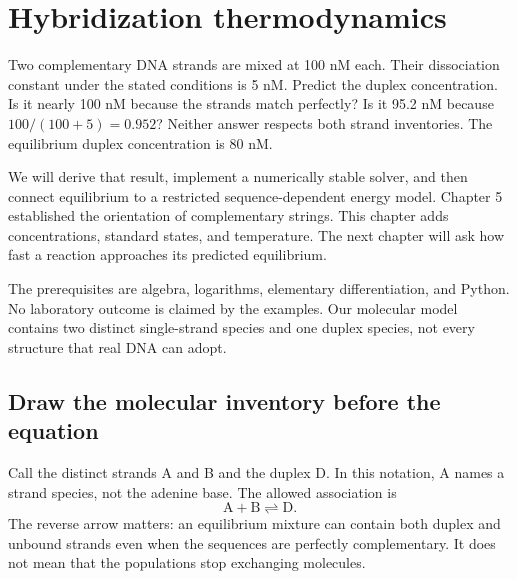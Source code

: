 \chapter{Hybridization thermodynamics}

Two complementary DNA strands are mixed at 100 nM each. Their dissociation
constant under the stated conditions is 5 nM. Predict the duplex concentration.
Is it nearly 100 nM because the strands match perfectly? Is it 95.2 nM
because $100/(100+5)=0.952$? Neither answer respects both strand inventories.
The equilibrium duplex concentration is 80 nM.

We will derive that result, implement a numerically stable solver, and then
connect equilibrium to a restricted sequence-dependent energy model.
Chapter 5 established the orientation of complementary strings. This chapter
adds concentrations, standard states, and temperature. The next chapter will
ask how fast a reaction approaches its predicted equilibrium.

The prerequisites are algebra, logarithms, elementary differentiation, and
Python. No laboratory outcome is claimed by the examples. Our molecular
model contains two distinct single-strand species and one duplex species,
not every structure that real DNA can adopt.

\section{Draw the molecular inventory before the equation}

Call the distinct strands A and B and the duplex D. In this notation,
A names a strand species, not the adenine base. The allowed association is
\begin{equation}
\mathrm{A}+\mathrm{B}\rightleftharpoons\mathrm{D}.
\label{eq:association}
\end{equation}
The reverse arrow matters: an equilibrium mixture can contain both duplex
and unbound strands even when the sequences are perfectly complementary.
It does not mean that the populations stop exchanging molecules.


